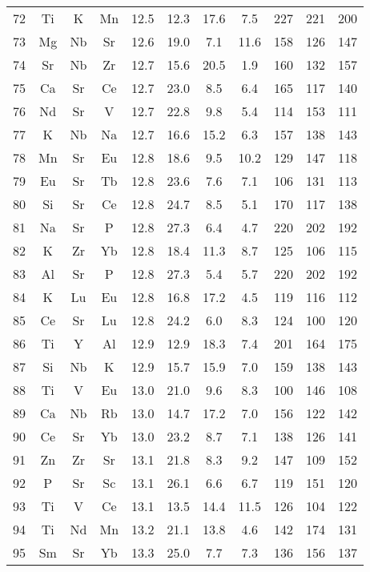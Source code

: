 \begin{center}
\begin{xtabular}{c|ccc|cccc|ccc}
 72 &  Ti &   K &  Mn &  12.5 &  12.3 &  17.6 & 7.5 & 227 & 221 & 200 \\
 73 &  Mg &  Nb &  Sr &  12.6 &  19.0 & 7.1 &  11.6 & 158 & 126 & 147 \\
 74 &  Sr &  Nb &  Zr &  12.7 &  15.6 &  20.5 & 1.9 & 160 & 132 & 157 \\
 75 &  Ca &  Sr &  Ce &  12.7 &  23.0 & 8.5 & 6.4 & 165 & 117 & 140 \\
 76 &  Nd &  Sr &   V &  12.7 &  22.8 & 9.8 & 5.4 & 114 & 153 & 111 \\
 77 &   K &  Nb &  Na &  12.7 &  16.6 &  15.2 & 6.3 & 157 & 138 & 143 \\
 78 &  Mn &  Sr &  Eu &  12.8 &  18.6 & 9.5 &  10.2 & 129 & 147 & 118 \\
 79 &  Eu &  Sr &  Tb &  12.8 &  23.6 & 7.6 & 7.1 & 106 & 131 & 113 \\
 80 &  Si &  Sr &  Ce &  12.8 &  24.7 & 8.5 & 5.1 & 170 & 117 & 138 \\
 81 &  Na &  Sr &   P &  12.8 &  27.3 & 6.4 & 4.7 & 220 & 202 & 192 \\
 82 &   K &  Zr &  Yb &  12.8 &  18.4 &  11.3 & 8.7 & 125 & 106 & 115 \\
 83 &  Al &  Sr &   P &  12.8 &  27.3 & 5.4 & 5.7 & 220 & 202 & 192 \\
 84 &   K &  Lu &  Eu &  12.8 &  16.8 &  17.2 & 4.5 & 119 & 116 & 112 \\
 85 &  Ce &  Sr &  Lu &  12.8 &  24.2 & 6.0 & 8.3 & 124 & 100 & 120 \\
 86 &  Ti &   Y &  Al &  12.9 &  12.9 &  18.3 & 7.4 & 201 & 164 & 175 \\
 87 &  Si &  Nb &   K &  12.9 &  15.7 &  15.9 & 7.0 & 159 & 138 & 143 \\
 88 &  Ti &   V &  Eu &  13.0 &  21.0 & 9.6 & 8.3 & 100 & 146 & 108 \\
 89 &  Ca &  Nb &  Rb &  13.0 &  14.7 &  17.2 & 7.0 & 156 & 122 & 142 \\
 90 &  Ce &  Sr &  Yb &  13.0 &  23.2 & 8.7 & 7.1 & 138 & 126 & 141 \\
 91 &  Zn &  Zr &  Sr &  13.1 &  21.8 & 8.3 & 9.2 & 147 & 109 & 152 \\
 92 &   P &  Sr &  Sc &  13.1 &  26.1 & 6.6 & 6.7 & 119 & 151 & 120 \\
 93 &  Ti &   V &  Ce &  13.1 &  13.5 &  14.4 &  11.5 & 126 & 104 & 122 \\
 94 &  Ti &  Nd &  Mn &  13.2 &  21.1 &  13.8 & 4.6 & 142 & 174 & 131 \\
 95 &  Sm &  Sr &  Yb &  13.3 &  25.0 & 7.7 & 7.3 & 136 & 156 & 137 \\

\end{xtabular}
\end{center}
